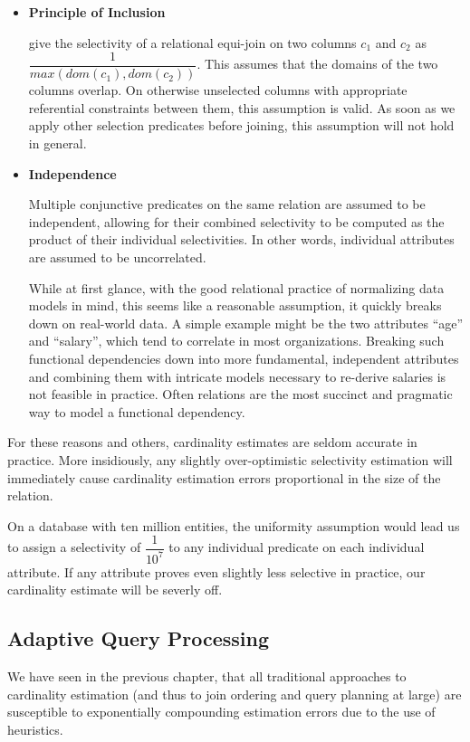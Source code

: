 \documentclass[../index.tex]{subfiles}
\begin{document}
\begin{itemize}
\item \textbf{Principle of Inclusion}

\cite{selinger1979access} give the selectivity of a relational
equi-join on two columns $c_1$ and $c_2$ as
$\dfrac{1}{max(dom(c_1),dom(c_2))}$. This assumes that the domains of
the two columns overlap. On otherwise unselected columns with
appropriate referential constraints between them, this assumption is
valid. As soon as we apply other selection predicates before joining,
this assumption will not hold in general.

\item \textbf{Independence}

Multiple conjunctive predicates on the same relation are assumed to be
independent, allowing for their combined selectivity to be computed as
the product of their individual selectivities. In other words,
individual attributes are assumed to be uncorrelated.

While at first glance, with the good relational practice of
normalizing data models in mind, this seems like a reasonable
assumption, it quickly breaks down on real-world data. A simple
example might be the two attributes ``age'' and ``salary'', which tend
to correlate in most organizations. Breaking such functional
dependencies down into more fundamental, independent attributes and
combining them with intricate models necessary to re-derive salaries
is not feasible in practice. Often relations are the most succinct and
pragmatic way to model a functional dependency.

\end{itemize}

For these reasons and others, cardinality estimates are seldom
accurate in practice. More insidiously, any slightly over-optimistic
selectivity estimation will immediately cause cardinality estimation
errors proportional in the size of the relation.

On a database with ten million entities, the uniformity assumption
would lead us to assign a selectivity of $\dfrac{1}{10^7}$ to any
individual predicate on each individual attribute. If any attribute
proves even slightly less selective in practice, our cardinality
estimate will be severly off.

\subsection{Adaptive Query Processing} \label{technique-adaptive}

We have seen in the previous chapter, that all traditional approaches
to cardinality estimation (and thus to join ordering and query
planning at large) are susceptible to exponentially compounding
estimation errors due to the use of heuristics.
\end{document}
